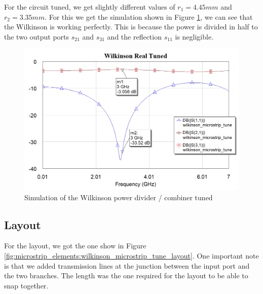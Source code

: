 \documentclass[12pt]{report} %
\begin{document}
For the circuit tuned, we get slightly different values of $r_1 = 4.45mm$ and $r_2 = 3.35 mm$. For this we get the simulation shown in Figure \ref{fig:microstrip_elements:wilkinson_microstrip_tune_graph}, we can see that the Wilkinson is working perfectly. This is because the power is divided in half to the two output ports $s_{21}$ and $s_{31}$ and the reflection $s_{11}$ is negligible.

\begin{figure}[htbp]
    \centering
    \includegraphics[width=1\linewidth]{images//microstrip_elements/wilkinson_microstrip_tune_graph.png}
    \caption{Simulation of the Wilkinson power divider / combiner tuned}
    \label{fig:microstrip_elements:wilkinson_microstrip_tune_graph}
\end{figure}

\subsection{Layout}

For the layout, we got the one show in Figure \ref{fig:microstrip_elements:wilkinson_microstrip_tune_layout}. One important note is that we added transmission lines at the junction between the input port and the two branches. The length was the one required for the layout to be able to snap together.
\end{document}
